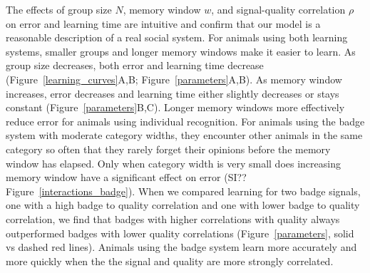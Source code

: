 The effects of group size $N$, memory window $w$, and signal-quality correlation $\rho$ on error and learning time are intuitive and confirm that our model is a reasonable description of a real social system. For animals using both learning systems, smaller groups and longer memory windows make it easier to learn. As group size decreases, both error and learning time decrease (Figure~\ref{learning_curves}A,B; Figure~\ref{parameters}A,B). As memory window increases, error decreases and learning time either slightly decreases or stays constant (Figure~\ref{parameters}B,C). Longer memory windows more effectively reduce error for animals using individual recognition. For animals using the badge system with moderate category widths, they encounter other animals in the same category so often that they rarely forget their opinions before the memory window has elapsed. Only when category width is very small does increasing memory window have a significant effect on error (SI?? Figure~\ref{interactions_badge}). When we compared learning for two badge signals, one with a high badge to quality correlation and one with lower badge to quality correlation, we find that badges with higher correlations with quality always outperformed badges with lower quality correlations (Figure~\ref{parameters}, solid vs dashed red lines). Animals using the badge system learn more accurately and more quickly when the the signal and quality are more strongly correlated.

 
